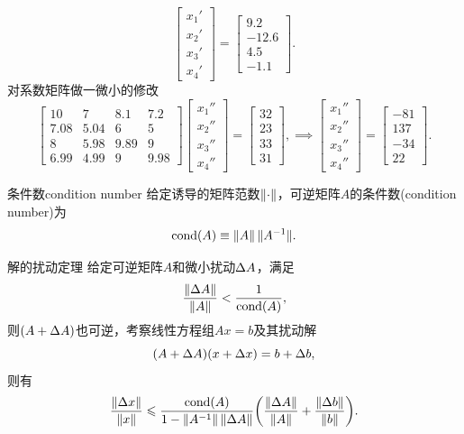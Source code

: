 \begin{example}
\[\begin{bmatrix}
            x_1'\\x_2'\\x_3'\\x_4'
        \end{bmatrix}=\begin{bmatrix}
            9.2\\-12.6\\4.5\\-1.1
        \end{bmatrix}.
    \]
    对系数矩阵做一微小的修改
    \[
        \begin{bmatrix}
            10&7&8.1&7.2\\
            7.08&5.04&6&5\\
            8&5.98&9.89&9\\
            6.99&4.99&9&9.98
        \end{bmatrix}\begin{bmatrix}
            x_1''\\x_2''\\x_3''\\x_4''
        \end{bmatrix}=\begin{bmatrix}
            32\\23\\33\\31
        \end{bmatrix},\implies\begin{bmatrix}
            x_1''\\x_2''\\x_3''\\x_4''
        \end{bmatrix}=\begin{bmatrix}
            -81\\137\\-34\\22
        \end{bmatrix}.
    \]
\end{example}

\begin{definition}
    {条件数}{condition number}
    给定诱导的矩阵范数$\left\lVert\cdot\right\rVert$，可逆矩阵$A$的条件数(condition number)为
    \begin{equation}
        \operatorname{cond}(A)\equiv\left\lVert A\right\rVert\lVert A^{-1}\rVert.
    \end{equation}
\end{definition}

\begin{theorem}
    {解的扰动定理}{}
    给定可逆矩阵$A$和微小扰动$\Delta A$，满足
    \[
        \frac{\left\lVert\Delta A\right\rVert}{\left\lVert A\right\rVert}<\frac1{\operatorname{cond}(A)},
    \]
    则$(A+\Delta A)$也可逆，考察线性方程组$Ax=b$及其扰动解
    \[
        (A+\Delta A)(x+\Delta x)=b+\Delta b,
    \]
    则有
    \begin{equation}
        \frac{\left\lVert\Delta x\right\rVert}{\left\lVert x\right\rVert}\leqslant\frac{\operatorname{cond}(A)}{1-\left\lVert A^{-1}\right\rVert\left\lVert\Delta A\right\rVert}\biggl(\frac{\left\lVert\Delta A\right\rVert}{\left\lVert A\right\rVert}+\frac{\left\lVert\Delta b\right\rVert}{\left\lVert b\right\rVert}\biggr).
    \end{equation}
\end{theorem}

